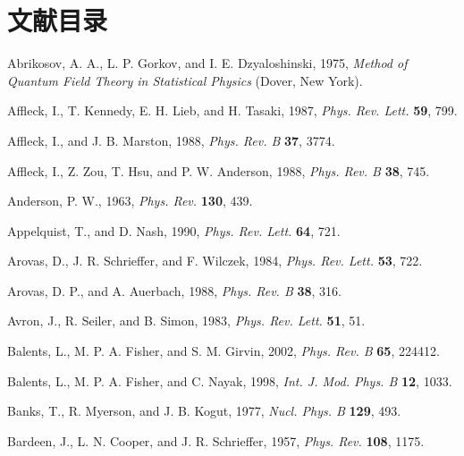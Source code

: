 
\chapter*{文献目录}

\begin{list}{}{\setlength{\leftmargin}{2em}\setlength{\itemindent}{-2em}}

\item Abrikosov, A. A., L. P. Gorkov, and I. E. Dzyaloshinski, 1975, \emph{Method of Quantum Field Theory in Statistical Physics} (Dover, New York).
\item Affleck, I., T. Kennedy, E. H. Lieb, and H. Tasaki, 1987, \emph{Phys. Rev. Lett.} \textbf{59}, 799.
\item Affleck, I., and J. B. Marston, 1988, \emph{Phys. Rev. B} \textbf{37}, 3774.
\item Affleck, I., Z. Zou, T. Hsu, and P. W. Anderson, 1988, \emph{Phys. Rev. B} \textbf{38}, 745.
\item Anderson, P. W., 1963, \emph{Phys. Rev.} \textbf{130}, 439.
\item Appelquist, T., and D. Nash, 1990, \emph{Phys. Rev. Lett.} \textbf{64}, 721.
\item Arovas, D., J. R. Schrieffer, and F. Wilczek, 1984, \emph{Phys. Rev. Lett.} \textbf{53}, 722.
\item Arovas, D. P., and A. Auerbach, 1988, \emph{Phys. Rev. B} \textbf{38}, 316.
\item Avron, J., R. Seiler, and B. Simon, 1983, \emph{Phys. Rev. Lett.} \textbf{51}, 51.
\item Balents, L., M. P. A. Fisher, and S. M. Girvin, 2002, \emph{Phys. Rev. B} \textbf{65}, 224412.
\item Balents, L., M. P. A. Fisher, and C. Nayak, 1998, \emph{Int. J. Mod. Phys. B} \textbf{12}, 1033.
\item Banks, T., R. Myerson, and J. B. Kogut, 1977, \emph{Nucl. Phys. B} \textbf{129}, 493.
\item Bardeen, J., L. N. Cooper, and J. R. Schrieffer, 1957, \emph{Phys. Rev.} \textbf{108}, 1175.

\end{list}
